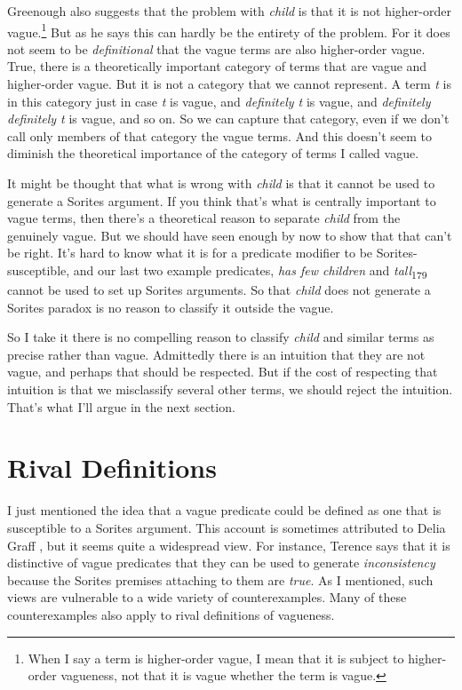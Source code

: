Greenough also suggests that the problem with \textit{child} is that it is not higher-order vague.\footnote{When I say a term is higher-order vague, I mean that it is subject to higher-order vagueness, not that it is vague whether the term is vague. } But as he says this can hardly be the entirety of the problem. For it does not seem to be \textit{definitional} that the vague terms are also higher-order vague. True, there is a theoretically important category of terms that are vague and higher-order vague. But it is not a category that we cannot represent. A term \textit{t} is in this category just in case \textit{t} is vague, and \textit{definitely t} is vague, and \textit{definitely definitely t} is vague, and so on. So we can capture that category, even if we don't call only members of that category the vague terms. And this doesn't seem to diminish the theoretical importance of the category of terms I called vague.

It might be thought that what is wrong with \textit{child} is that it cannot be used to generate a Sorites argument. If you think that's what is centrally important to vague terms, then there's a theoretical reason to separate \textit{child} from the genuinely vague. But we should have seen enough by now to show that that can't be right. It's hard to know what it is for a predicate modifier to be Sorites-susceptible, and our last two example predicates, \textit{has few children} and \textit{tall}\textsubscript{179} cannot be used to set up Sorites arguments. So that \textit{child} does not generate a Sorites paradox is no reason to classify it outside the vague.

So I take it there is no compelling reason to classify \textit{child} and similar terms as precise rather than vague. Admittedly there is an intuition that they are not vague, and perhaps that should be respected. But if the cost of respecting that intuition is that we misclassify several other terms, we should reject the intuition. That's what I'll argue in the next section.

\section{Rival Definitions}

I just mentioned the idea that a vague predicate could be defined as one that is susceptible to a Sorites argument. This account is sometimes attributed to Delia Graff \citet{Fara2000}, but it seems quite a widespread view. For instance, Terence \citet{Horgan1995} says that it is distinctive of vague predicates that they can be used to generate \textit{inconsistency} because the Sorites premises attaching to them are \textit{true}. As I mentioned, such views are vulnerable to a wide variety of counterexamples. Many of these counterexamples also apply to rival definitions of vagueness.

